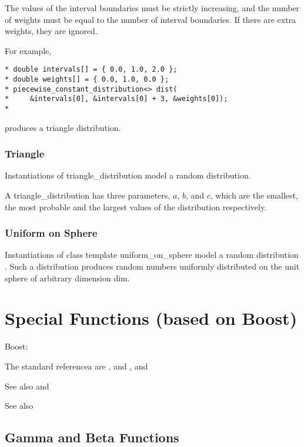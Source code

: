 The values of the interval boundaries must be strictly increasing, and the number of weights must be equal to the number of interval boundaries. If there are extra weights, they are ignored.

For example,
\begin{verbatim}
* double intervals[] = { 0.0, 1.0, 2.0 };
* double weights[] = { 0.0, 1.0, 0.0 };
* piecewise_constant_distribution<> dist(
*     &intervals[0], &intervals[0] + 3, &weights[0]);
* 
\end{verbatim}

produces a triangle distribution. 




\subsection{Triangle}
Instantiations of triangle\_distribution model a random distribution. 

A triangle\_distribution has three parameters, $a$, $b$, and $c$, which are the smallest, the most probable and the largest values of the distribution respectively. 


\subsection{Uniform on Sphere}
Instantiations of class template uniform\_on\_sphere model a random distribution . Such a distribution produces random numbers uniformly distributed on the unit sphere of arbitrary dimension dim. 






\chapter{Special Functions (based on Boost)}
\label{BoostSpecialFunctionsBoost} %


Boost: \cite{boost_multiprecision}


The standard referencea are \cite{NIST}, and \cite{Temme1996}, and \cite{NumericalRecipes_2007}

See also \cite{Gil2007} and \cite{Gil2011}


See also  \cite{Cuyt_2008}


\section{Gamma and Beta Functions}
\label{GammaFunctionBoost}

